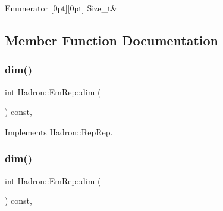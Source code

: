\begin{DoxyEnumFields}{Enumerator}
[0pt][0pt]{}\mbox{\label{structHadron_1_1EmRep_a2d0263f8a0de5733964f7da4c0bfc009a623644658daf44b84d24cef484208987}} 
Size\+\_\+t&\\
\hline

\end{DoxyEnumFields}


\subsection{Member Function Documentation}
\mbox{\label{structHadron_1_1EmRep_a446425f715385b4b8ac879d3ffec864f}} 
\subsubsection{\texorpdfstring{dim()}{dim()}\hspace{0.1cm}{\footnotesize\ttfamily [1/3]}}
{\footnotesize\ttfamily int Hadron\+::\+Em\+Rep\+::dim (\begin{DoxyParamCaption}{ }\end{DoxyParamCaption}) const\hspace{0.3cm}{\ttfamily [inline]}, {\ttfamily [virtual]}}



Implements \mbox{\hyperlink{structHadron_1_1RepRep_a92c8802e5ed7afd7da43ccfd5b7cd92b}{Hadron\+::\+Rep\+Rep}}.

\mbox{\label{structHadron_1_1EmRep_a446425f715385b4b8ac879d3ffec864f}} 
\subsubsection{\texorpdfstring{dim()}{dim()}\hspace{0.1cm}{\footnotesize\ttfamily [2/3]}}
{\footnotesize\ttfamily int Hadron\+::\+Em\+Rep\+::dim (\begin{DoxyParamCaption}{ }\end{DoxyParamCaption}) const\hspace{0.3cm}{\ttfamily [inline]}, {\ttfamily [virtual]}}




